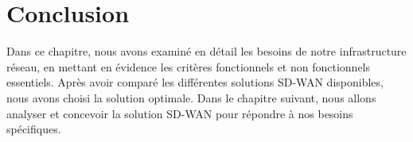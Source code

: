 \section*{Conclusion }

Dans ce chapitre, nous avons examiné en détail les besoins de notre infrastructure réseau, en mettant en évidence les critères fonctionnels et non fonctionnels essentiels. Après avoir comparé les différentes solutions SD-WAN disponibles, nous avons choisi la solution optimale. Dans le chapitre suivant, nous allons analyser et concevoir la solution SD-WAN pour répondre à nos besoins spécifiques.






















